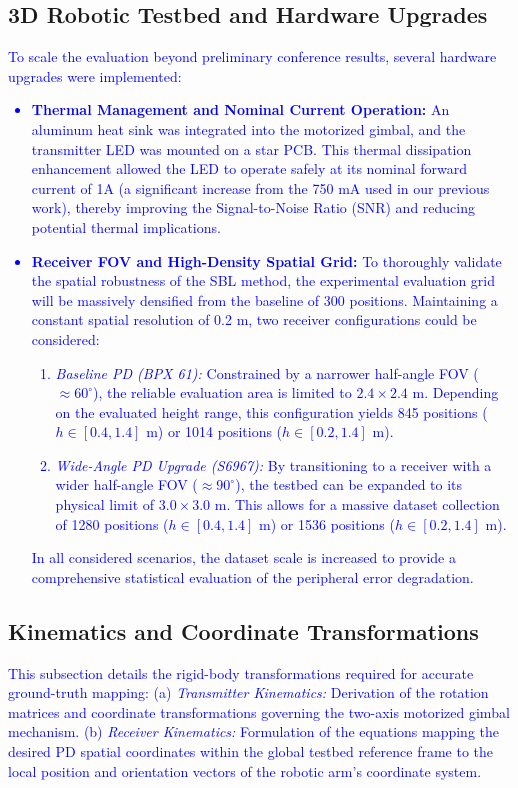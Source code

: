 \documentclass[journal]{IEEEtran}
\begin{document}
    \subsection{3D Robotic Testbed and Hardware Upgrades}
    \textcolor{blue}{To scale the evaluation beyond preliminary conference results, several hardware upgrades were implemented:
        \begin{itemize}
            \item \textbf{Thermal Management and Nominal Current Operation:} An aluminum heat sink was integrated into the motorized gimbal, and the transmitter LED was mounted on a star PCB. This thermal dissipation enhancement allowed the LED to operate safely at its nominal forward current of 1A (a significant increase from the 750 mA used in our previous work), thereby improving the Signal-to-Noise Ratio (SNR) and reducing potential thermal implications.
            \item \textbf{Receiver FOV and High-Density Spatial Grid:} To thoroughly validate the spatial robustness of the SBL method, the experimental evaluation grid will be massively densified from the baseline of 300 positions. Maintaining a constant spatial resolution of 0.2 m, two receiver configurations could be considered:
            \begin{enumerate}
                \item \textit{Baseline PD (BPX 61):} Constrained by a narrower half-angle FOV ($\approx 60^\circ$), the reliable evaluation area is limited to $2.4 \times 2.4$ m. Depending on the evaluated height range, this configuration yields 845 positions ($h \in [0.4, 1.4]$ m) or 1014 positions ($h \in [0.2, 1.4]$ m).
                \item \textit{Wide-Angle PD Upgrade (S6967):} By transitioning to a receiver with a wider half-angle FOV ($\approx 90^\circ$), the testbed can be expanded to its physical limit of $3.0 \times 3.0$ m. This allows for a massive dataset collection of 1280 positions ($h \in [0.4, 1.4]$ m) or 1536 positions ($h \in [0.2, 1.4]$ m).
            \end{enumerate}
            In all considered scenarios, the dataset scale is increased to provide a comprehensive statistical evaluation of the peripheral error degradation.
        \end{itemize}
    }

    \subsection{Kinematics and Coordinate Transformations}
    \textcolor{blue}{This subsection details the rigid-body transformations required for accurate ground-truth mapping:
    (a) \textit{Transmitter Kinematics:} Derivation of the rotation matrices and coordinate transformations governing the two-axis motorized gimbal mechanism.
    (b) \textit{Receiver Kinematics:} Formulation of the equations mapping the desired PD spatial coordinates within the global testbed reference frame to the local position and orientation vectors of the robotic arm's coordinate system.}
\end{document}
